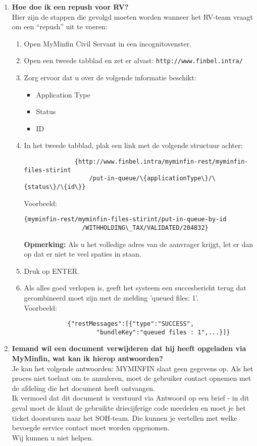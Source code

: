 \begin{enumerate}
    \item \textbf{Hoe doe ik een repush voor RV?} \\
    Hier zijn de stappen die gevolgd moeten worden wanneer het RV-team vraagt om een “repush” uit te voeren:
    \begin{enumerate}
        \item Open MyMinfin Civil Servant in een incognitovenster.
        \item Open een tweede tabblad en zet er alvast: \texttt{http://www.finbel.intra/}
        \item Zorg ervoor dat u over de volgende informatie beschikt:
        \begin{itemize}
            \item Application Type
            \item Status
            \item ID
        \end{itemize}
        \item In het tweede tabblad, plak een link met de volgende structuur achter:\\
          \begin{verbatim}
              {http://www.finbel.intra/myminfin-rest/myminfin-files-stirint
                  /put-in-queue/\{applicationType\}/\{status\}/\{id\}}
          \end{verbatim}
        Voorbeeld:\begin{verbatim}{myminfin-rest/myminfin-files-stirint/put-in-queue-by-id
                /WITHHOLDING\_TAX/VALIDATED/204832}\end{verbatim}
        \textbf{Opmerking:} Als u het volledige adres van de aanvrager krijgt, let er dan op dat er niet te veel spaties in staan.
        \item Druk op ENTER.
        \item Als alles goed verlopen is, geeft het systeem een succesbericht terug dat gecombineerd moet zijn met de melding 'queued files: 1'.\\
        Voorbeeld: 
        \begin{verbatim}
            {"restMessages":[{"type":"SUCCESS",
                    "bundleKey":"queued files : 1",...}]}
        \end{verbatim}
      \end{enumerate}
        
        \item \textbf{Iemand wil een document verwijderen dat hij heeft opgeladen via MyMinfin, wat kan ik hierop antwoorden?} \\
        Je kan het volgende antwoorden: MYMINFIN slaat geen gegevens op. Als het proces niet toelaat om te annuleren, moet de gebruiker contact opnemen met de afdeling die het document heeft ontvangen.\\
        Ik vermoed dat dit document is verstuurd via Antwoord op een brief - in dit geval moet de klant de gebruikte driecijferige code meedelen en moet je het ticket doorsturen naar het SOH-team. Die kunnen je vertellen met welke bevoegde service contact moet worden opgenomen.\\
        Wij kunnen u niet helpen.
        

\end{enumerate}
